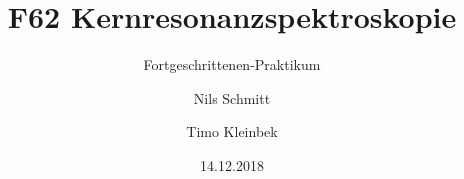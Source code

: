 
\title{F62 Kernresonanzspektroskopie}
\subtitle{Fortgeschrittenen-Praktikum}
\author{Nils Schmitt \and Timo Kleinbek}
\date{14.12.2018}